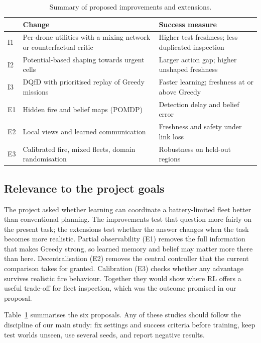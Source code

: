 \begin{table}[!t]
\centering
\caption{Summary of proposed improvements and extensions.}
\label{tab:plan}
\scriptsize
\setlength{\tabcolsep}{3pt}
\begin{tabular}{p{}p{}p{}}
\toprule
& Change & Success measure \\
\midrule
I1 & Per-drone utilities with a mixing network or counterfactual critic \cite{rashid2018,
foerster2018coma} & Higher test freshness; less duplicated inspection \\
I2 & Potential-based shaping towards urgent cells \cite{ng1999} & Larger action gap; higher
unshaped freshness \\
I3 & DQfD with prioritised replay of Greedy missions \cite{hester2018, schaul2016} & Faster
learning; freshness at or above Greedy \\
E1 & Hidden fire and belief maps (POMDP) \cite{hauskrecht2000, julian2019} & Detection delay
and belief error \\
E2 & Local views and learned communication \cite{foerster2016} & Freshness and safety under
link loss \\
E3 & Calibrated fire, mixed fleets, domain randomisation \cite{tobin2017, viseras2021} &
Robustness on held-out regions \\
\bottomrule
\end{tabular}
\end{table}

\subsection{Relevance to the project goals}

The project asked whether learning can coordinate a battery-limited fleet better than
conventional planning. The improvements test that question more fairly on the present task;
the extensions test whether the answer changes when the task becomes more realistic. Partial
observability (E1) removes the full information that makes Greedy strong, so learned memory
and belief may matter more there than here. Decentralisation (E2) removes the central
controller that the current comparison takes for granted. Calibration (E3) checks whether
any advantage survives realistic fire behaviour. Together they would show where RL offers a
useful trade-off for fleet inspection, which was the outcome promised in our proposal.

Table~\ref{tab:plan} summarises the six proposals. Any of these studies should follow the
discipline of our main study: fix settings and success criteria before training, keep test
worlds unseen, use several seeds, and report negative results.
